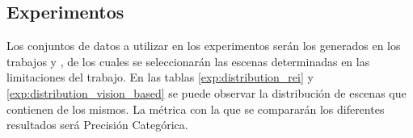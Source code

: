 








\subsection{Experimentos}
Los conjuntos de datos a utilizar en los experimentos serán los generados en los trabajos \cite{vision_based_real_estate_price_estimation} y \cite{lstm_real_estate}, de los cuales se seleccionarán las escenas determinadas en las limitaciones del trabajo. En las tablas \ref{exp:distribution_rei} y \ref{exp:distribution_vision_based} se puede observar la distribución de escenas que contienen de los mismos. La métrica con la que se compararán los diferentes resultados será Precisión Categórica.

